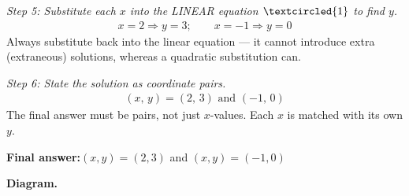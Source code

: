 \documentclass[11pt]{article}
\begin{document}
\textit{Step 5: Substitute each \( x \) into the LINEAR equation \( \textcircled{1} \) to find \( y \).}
\[\begin{gathered}
x = 2 \Rightarrow y = 3; \qquad x = -1 \Rightarrow y = 0
\end{gathered}\]
Always substitute back into the linear equation --- it cannot introduce extra (extraneous) solutions, whereas a quadratic substitution can.

\textit{Step 6: State the solution as coordinate pairs.}
\[\begin{gathered}
(x,\, y) = (2,\, 3) \text{ and } (-1,\, 0)
\end{gathered}\]
The final answer must be pairs, not just \( x \)-values. Each \( x \) is matched with its own \( y \).

\begin{answerbox}
\textbf{Final answer:}\quad \(\displaystyle (x, y) = (2, 3)\) and \(\displaystyle (x, y) = (-1, 0)\)
\end{answerbox}
\textbf{Diagram.}
\end{document}
